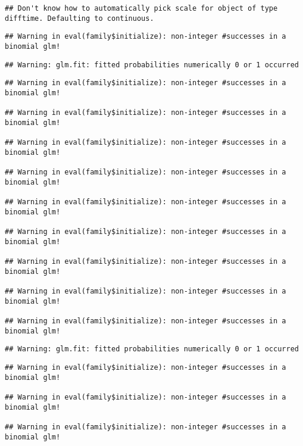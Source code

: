 \documentclass[
]{article}
\begin{document}
\begin{verbatim}
## Don't know how to automatically pick scale for object of type difftime. Defaulting to continuous.
\end{verbatim}

\begin{verbatim}
## Warning in eval(family$initialize): non-integer #successes in a binomial glm!
\end{verbatim}

\begin{verbatim}
## Warning: glm.fit: fitted probabilities numerically 0 or 1 occurred
\end{verbatim}

\begin{verbatim}
## Warning in eval(family$initialize): non-integer #successes in a binomial glm!

## Warning in eval(family$initialize): non-integer #successes in a binomial glm!

## Warning in eval(family$initialize): non-integer #successes in a binomial glm!

## Warning in eval(family$initialize): non-integer #successes in a binomial glm!

## Warning in eval(family$initialize): non-integer #successes in a binomial glm!

## Warning in eval(family$initialize): non-integer #successes in a binomial glm!

## Warning in eval(family$initialize): non-integer #successes in a binomial glm!

## Warning in eval(family$initialize): non-integer #successes in a binomial glm!

## Warning in eval(family$initialize): non-integer #successes in a binomial glm!
\end{verbatim}

\begin{verbatim}
## Warning: glm.fit: fitted probabilities numerically 0 or 1 occurred
\end{verbatim}

\begin{verbatim}
## Warning in eval(family$initialize): non-integer #successes in a binomial glm!

## Warning in eval(family$initialize): non-integer #successes in a binomial glm!

## Warning in eval(family$initialize): non-integer #successes in a binomial glm!
\end{verbatim}
\end{document}
